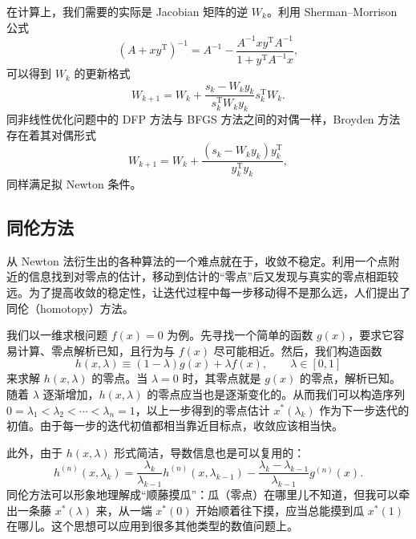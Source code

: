 在计算上，我们需要的实际是 Jacobian 矩阵的逆 $W_k$。利用 Sherman--Morrison 公式
\begin{equation}
(A+xy^{\mathrm T})^{-1}=A^{-1}-\frac{A^{-1}xy^{\mathrm T}A^{-1}}{1+y^{\mathrm T}A^{-1}x},
\tag{4.2.11}
\end{equation}
可以得到 $W_k$ 的更新格式
\begin{equation}
W_{k+1}=W_k+\frac{s_k-W_k y_k}{s_k^{\mathrm T}W_k y_k}s_k^{\mathrm T}W_k.
\tag{4.2.12}
\end{equation}
同非线性优化问题中的 DFP 方法与 BFGS 方法之间的对偶一样，Broyden 方法存在着其对偶形式
\begin{equation}
W_{k+1}=W_k+\frac{(s_k-W_k y_k)y_k^{\mathrm T}}{y_k^{\mathrm T}y_k},
\tag{4.2.13}
\end{equation}
同样满足拟 Newton 条件。

\subsection{同伦方法}

从 Newton 法衍生出的各种算法的一个难点就在于，收敛不稳定。利用一个点附近的信息找到对零点的估计，移动到估计的“零点”后又发现与真实的零点相距较远。为了提高收敛的稳定性，让迭代过程中每一步移动得不是那么远，人们提出了同伦（homotopy）方法。

我们以一维求根问题 $f(x)=0$ 为例。先寻找一个简单的函数 $g(x)$，要求它容易计算、零点解析已知，且行为与 $f(x)$ 尽可能相近。然后，我们构造函数
\begin{equation}
h(x,\lambda)\equiv(1-\lambda)g(x)+\lambda f(x),\qquad \lambda\in[0,1]
\tag{4.2.14}
\end{equation}
来求解 $h(x,\lambda)$ 的零点。当 $\lambda=0$ 时，其零点就是 $g(x)$ 的零点，解析已知。随着 $\lambda$ 逐渐增加，$h(x,\lambda)$ 的零点应当也是逐渐变化的。从而我们可以构造序列 $0=\lambda_1<\lambda_2<\cdots<\lambda_n=1$，以上一步得到的零点估计 $x^*(\lambda_k)$ 作为下一步迭代的初值。由于每一步的迭代初值都相当靠近目标点，收敛应该相当快。

此外，由于 $h(x,\lambda)$ 形式简洁，导数信息也是可以复用的：
\begin{equation}
h^{(n)}(x,\lambda_k)
=\frac{\lambda_k}{\lambda_{k-1}}h^{(n)}(x,\lambda_{k-1})
-\frac{\lambda_k-\lambda_{k-1}}{\lambda_{k-1}}g^{(n)}(x).
\tag{4.2.15}
\end{equation}
同伦方法可以形象地理解成“顺藤摸瓜”：瓜（零点）在哪里儿不知道，但我可以牵出一条藤 $x^*(\lambda)$ 来，从一端 $x^*(0)$ 开始顺着往下摸，应当总能摸到瓜 $x^*(1)$ 在哪儿。这个思想可以应用到很多其他类型的数值问题上。

